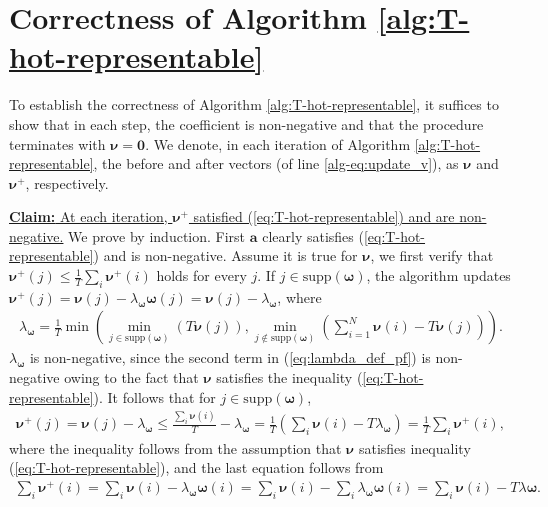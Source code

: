 \documentclass[11pt,letterpaper]{article}
\newcommand{\supp}{\mathrm{supp}}
\begin{document}
\appendix
\section{Correctness of Algorithm \ref{alg:T-hot-representable}} \label{sec:correctness_T-hot-representable}

To establish the correctness of Algorithm \ref{alg:T-hot-representable}, it suffices to show that in each step, the coefficient is non-negative and that the procedure terminates with $\boldsymbol{\nu} = \mathbf{0}$. We denote, in each iteration of Algorithm \ref{alg:T-hot-representable}, the before and after vectors  (of line \ref{alg-eq:update_v}), as $\boldsymbol{\nu}$ and $\boldsymbol{\nu}^+$, respectively.
 

\underline{\textbf{Claim:} At each iteration, $\boldsymbol{\nu}^{+}$ satisfied (\ref{eq:T-hot-representable}) and are non-negative.}
We prove by induction. First $\boldsymbol{a}$ clearly satisfies (\ref{eq:T-hot-representable}) and is non-negative. 
Assume it is true for $\boldsymbol{\nu}$, we first verify that $\boldsymbol{\nu}^{+}(j) \le \frac{1}{T}\sum_i \boldsymbol{\nu}^{+}(i)$ holds for every $j$. 
If $ j \in \supp(\boldsymbol{\omega})$, the algorithm updates $\boldsymbol{\nu}^{+}(j) = \boldsymbol{\nu}(j) - \lambda_{\boldsymbol{\omega}}\boldsymbol{\omega}(j) = \boldsymbol{\nu}(j) - \lambda_{\boldsymbol{\omega}}$, where 
\begin{align}
    \lambda_{\boldsymbol{\omega}} = \frac{1}{T}\min \left( \min_{j\in \supp(\boldsymbol{\omega})} \left( T\boldsymbol{\nu}(j)\right)  ,\min_{j\notin \supp(\boldsymbol{\omega})} \left( \sum^{N}_{i=1} \boldsymbol{\nu}(i)-T \boldsymbol{\nu}(j)\right) \right) . \label{eq:lambda_def_pf}
\end{align}
$\lambda_{\boldsymbol{\omega}}$ is non-negative, since the second term in (\ref{eq:lambda_def_pf}) is non-negative owing to the fact that $\boldsymbol{\nu}$ satisfies the inequality (\ref{eq:T-hot-representable}). It follows that for $ j \in \supp(\boldsymbol{\omega})$,
\begin{align}
    \boldsymbol{\nu}^{+}(j) = \boldsymbol{\nu}(j) - \lambda_{\boldsymbol{\omega}} \leq \frac{\sum_i \boldsymbol{\nu}(i)}{T} - \lambda_{\boldsymbol{\omega}} = \frac{1}{T} \left( \sum_i \boldsymbol{\nu}(i) - T\lambda_{\boldsymbol{\omega}}\right) = \frac{1}{T} \sum_i \boldsymbol{\nu}^+(i), \label{eq:at_in_A_pf1}
\end{align} 
where the inequality follows from the assumption that $\boldsymbol{\nu}$ satisfies inequality (\ref{eq:T-hot-representable}), and the last equation follows from 
\begin{align}
    \sum_i \boldsymbol{\nu}^+(i) = \sum_i\boldsymbol{\nu}(i) - \lambda_{\boldsymbol{\omega}}\boldsymbol{\omega}(i) = \sum_i\boldsymbol{\nu}(i) - \sum_i\lambda_{\boldsymbol{\omega}}\boldsymbol{\omega}(i) = \sum_i\boldsymbol{\nu}(i)- T\lambda{\boldsymbol{\omega}}. \label{eq:update_a_sum_is_sum_minus_theta} 
\end{align}
\end{document}
